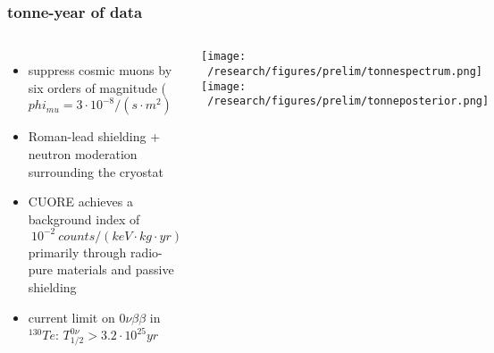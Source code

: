 \documentclass{beamer}
\begin{document}
	\begin{frame}
		\frametitle{tonne-year of data}
		\begin{columns}[c] %
			
			\begin{itemize}
			\item suppress cosmic muons by six orders of magnitude ($phi_{mu} = 3\cdot 10^{-8} / (s\cdot m^2)$
			\item Roman-lead shielding + neutron moderation surrounding the cryostat
			\item CUORE achieves a background index of $~ 10^{-2} \  counts/(keV\cdot kg \cdot yr)$ primarily through radio-pure materials and passive shielding
			\item current limit on $0\nu\beta\beta$ in $^{130}Te$: $T_{1/2}^{0\nu} > 3.2\cdot 10^{25}yr$ 
			\end{itemize}			 
			
		
			\texttt{[image: ~/research/figures/prelim/tonnespectrum.png]}
			\vspace{-10pt}
			\texttt{[image: ~/research/figures/prelim/tonneposterior.png]}
			
		\end{columns}
	\end{frame}
%			
%			
%		
%			
	
\end{document}
